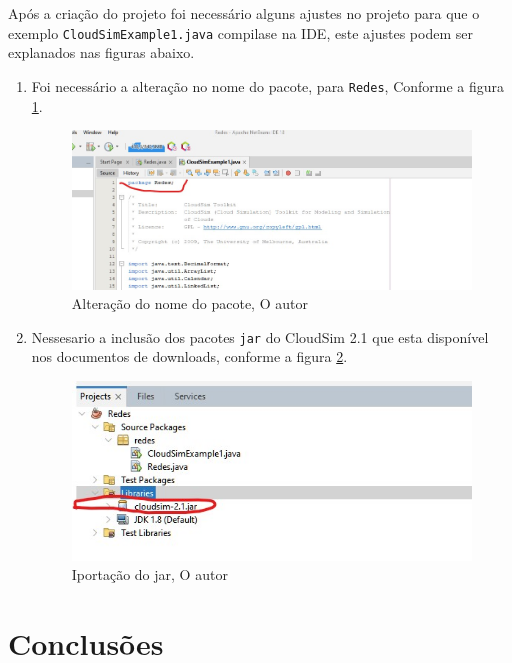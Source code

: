 \par Após a criação do projeto foi necessário alguns ajustes no projeto para que o exemplo \verb#CloudSimExample1.java# compilase na IDE, este ajustes podem ser explanados nas figuras abaixo.

\begin{enumerate}[label=\Roman{*}, ref=(\roman{*})]
  \item Foi necessário a alteração no nome do pacote, para \verb#Redes#, Conforme a figura \ref{fig:rename_pacote}. \newline
  \begin{figure}[h]
    \center
    \includegraphics[scale=.5]{figure/rename_pacote.jpg}
    \caption{Alteração do nome do pacote, O autor}
    \label{fig:rename_pacote}
  \end{figure}

  \item Nessesario a inclusão dos pacotes \verb#jar# do CloudSim 2.1 que esta disponível nos documentos de downloads, conforme a figura \ref{fig:import_jar}. \newline
  \begin{figure}[h]
    \center
    \includegraphics[scale=.8]{figure/import_jar.jpg}
    \caption{Iportação do jar, O autor}
    \label{fig:import_jar}
  \end{figure}
\end{enumerate}


\section{Conclusões}

